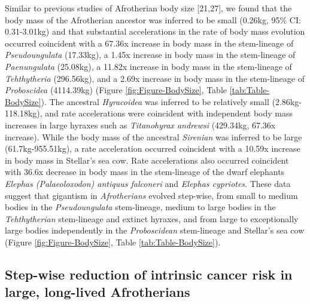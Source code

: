 \documentclass[]{elsarticle} %
\begin{document}
Similar to previous studies of Afrotherian body size {[}21,27{]}, we found that the body mass of the Afrotherian ancestor was inferred to be small (0.26kg, 95\% CI: 0.31-3.01kg) and that substantial accelerations in the rate of body mass evolution occurred coincident with a 67.36x increase in body mass in the stem-lineage of \emph{Pseudoungulata} (17.33kg), a 1.45x increase in body mass in the stem-lineage of \emph{Paenungulata} (25.08kg), a 11.82x increase in body mass in the stem-lineage of \emph{Tehthytheria} (296.56kg), and a 2.69x increase in body mass in the stem-lineage of \emph{Proboscidea} (4114.39kg) (Figure \ref{fig:Figure-BodySize}, Table \ref{tab:Table-BodySize}). The ancestral \emph{Hyracoidea} was inferred to be relatively small (2.86kg-118.18kg), and rate accelerations were coincident with independent body mass increases in large hyraxes such as \emph{Titanohyrax andrewsi} (429.34kg, 67.36x increase). While the body mass of the ancestral \emph{Sirenian} was inferred to be large (61.7kg-955.51kg), a rate acceleration occurred coincident with a 10.59x increase in body mass in Stellar's sea cow. Rate accelerations also occurred coincident with 36.6x decrease in body mass in the stem-lineage of the dwarf elephants \emph{Elephas (Palaeoloxodon) antiquus falconeri} and \emph{Elephas cypriotes}. These data suggest that gigantism in \emph{Afrotherians} evolved step-wise, from small to medium bodies in the \emph{Pseudoungulata} stem-lineage, medium to large bodies in the \emph{Tehthytherian} stem-lineage and extinct hyraxes, and from large to exceptionally large bodies independently in the \emph{Proboscidean} stem-lineage and Stellar's sea cow (Figure \ref{fig:Figure-BodySize}, Table \ref{tab:Table-BodySize}).

\hypertarget{step-wise-reduction-of-intrinsic-cancer-risk-in-large-long-lived-afrotherians}{%
\subsection{Step-wise reduction of intrinsic cancer risk in large, long-lived Afrotherians}\label{step-wise-reduction-of-intrinsic-cancer-risk-in-large-long-lived-afrotherians}}
\end{document}
